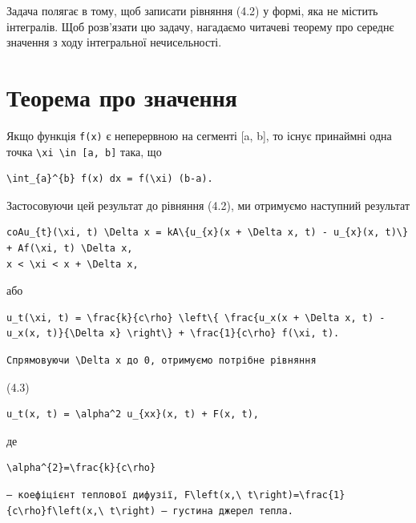 \documentclass[
  ukrainian,
]{article}
\begin{document}
Задача полягає в тому, щоб записати рівняння (4.2) у формі, яка не
містить інтегралів. Щоб розв'язати цю задачу, нагадаємо читачеві теорему
про середнє значення з ходу інтегральної нечисельності.

\section{Теорема про
значення}\label{ux442ux435ux43eux440ux435ux43cux430-ux43fux440ux43e-ux437ux43dux430ux447ux435ux43dux43dux44f}

Якщо функція \texttt{f(x)} є неперервною на сегменті {[}a, b{]}, то
існує принаймні одна точка
\texttt{\textbackslash{}xi\ \textbackslash{}in\ {[}a,\ b{]}} така, що

\begin{verbatim}
\int_{a}^{b} f(x) dx = f(\xi) (b-a).
\end{verbatim}

Застосовуючи цей результат до рівняння (4.2), ми отримуємо наступний
результат

\begin{verbatim}
coAu_{t}(\xi, t) \Delta x = kA\{u_{x}(x + \Delta x, t) - u_{x}(x, t)\} + Af(\xi, t) \Delta x,
x < \xi < x + \Delta x,
\end{verbatim}

або

\begin{verbatim}
u_t(\xi, t) = \frac{k}{c\rho} \left\{ \frac{u_x(x + \Delta x, t) - u_x(x, t)}{\Delta x} \right\} + \frac{1}{c\rho} f(\xi, t).
\end{verbatim}

\begin{verbatim}
Спрямовуючи \Delta x до 0, отримуємо потрібне рівняння
\end{verbatim}

(4.3)

\begin{verbatim}
u_t(x, t) = \alpha^2 u_{xx}(x, t) + F(x, t),
\end{verbatim}

де

\begin{verbatim}
\alpha^{2}=\frac{k}{c\rho}
\end{verbatim}

\begin{verbatim}
— коефіцієнт теплової дифузії, F\left(x,\ t\right)=\frac{1}{c\rho}f\left(x,\ t\right) — густина джерел тепла.
\end{verbatim}
\end{document}
